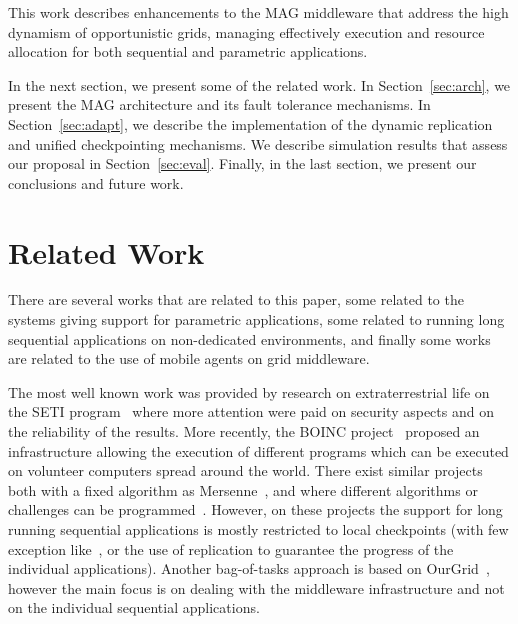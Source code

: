 \documentclass[times, 09pt, twocolumn]{article}
\begin{document}
This work describes enhancements to the MAG middleware that
address the high dynamism of opportunistic
grids, managing effectively execution and resource allocation for both sequential and
parametric applications. 

In the next section, we present some of the related work. In
Section~\ref{sec:arch}, we present the MAG architecture and its fault tolerance
mechanisms. In Section~\ref{sec:adapt}, we describe the implementation
of the dynamic replication and unified checkpointing mechanisms. We describe
simulation results that assess our proposal in Section~\ref{sec:eval}.
Finally, in the last section, we present our conclusions and future work.



\section{Related Work}

There are several works that are related to this paper, some related to the
systems giving support for parametric applications, some related to
running long sequential applications on non-dedicated environments, and finally
some works are related to the use of mobile agents on grid middleware.

The most well known work was provided by research on extraterrestrial life on
the SETI program~\cite{seti} where more attention were paid on security aspects
and on the reliability of the results. More recently, the BOINC
project~\cite{boinc} proposed an infrastructure allowing the execution of
different programs which can be executed on volunteer computers spread around
the world. There exist similar projects both with a fixed algorithm as
Mersenne~\cite{mersenne}, and where different algorithms or challenges can be
programmed~\cite{distributed}. However, on these projects the support for long
running sequential applications is mostly restricted to local checkpoints (with
few exception like~\cite{climate}, or the use of replication to guarantee the
progress of the individual applications). Another bag-of-tasks approach is
based on OurGrid~\cite{cirne06}, however the main focus is on dealing with
the middleware infrastructure and not on the individual sequential
applications.
\end{document}
